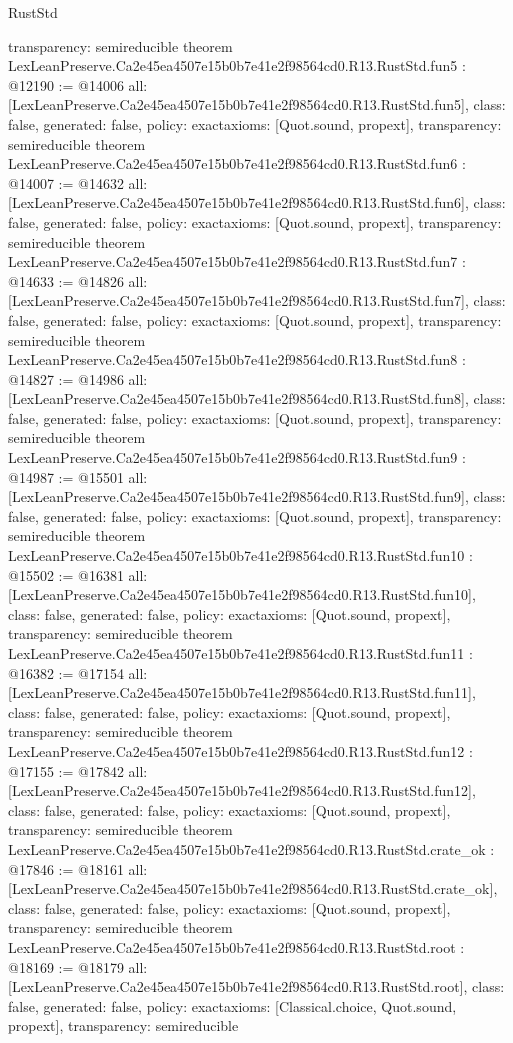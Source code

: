 \begin{lexlean}{RustStd}
\begin{coremodule}
{  transparency: semireducible
}
theorem LexLeanPreserve.Ca2e45ea4507e15b0b7e41e2f98564cd0.R13.RustStd.fun5 : @12190 := @14006 {
  all: [LexLeanPreserve.Ca2e45ea4507e15b0b7e41e2f98564cd0.R13.RustStd.fun5],
  class: false,
  generated: false,
  policy: exact{axioms: [Quot.sound, propext]},
  transparency: semireducible
}
theorem LexLeanPreserve.Ca2e45ea4507e15b0b7e41e2f98564cd0.R13.RustStd.fun6 : @14007 := @14632 {
  all: [LexLeanPreserve.Ca2e45ea4507e15b0b7e41e2f98564cd0.R13.RustStd.fun6],
  class: false,
  generated: false,
  policy: exact{axioms: [Quot.sound, propext]},
  transparency: semireducible
}
theorem LexLeanPreserve.Ca2e45ea4507e15b0b7e41e2f98564cd0.R13.RustStd.fun7 : @14633 := @14826 {
  all: [LexLeanPreserve.Ca2e45ea4507e15b0b7e41e2f98564cd0.R13.RustStd.fun7],
  class: false,
  generated: false,
  policy: exact{axioms: [Quot.sound, propext]},
  transparency: semireducible
}
theorem LexLeanPreserve.Ca2e45ea4507e15b0b7e41e2f98564cd0.R13.RustStd.fun8 : @14827 := @14986 {
  all: [LexLeanPreserve.Ca2e45ea4507e15b0b7e41e2f98564cd0.R13.RustStd.fun8],
  class: false,
  generated: false,
  policy: exact{axioms: [Quot.sound, propext]},
  transparency: semireducible
}
theorem LexLeanPreserve.Ca2e45ea4507e15b0b7e41e2f98564cd0.R13.RustStd.fun9 : @14987 := @15501 {
  all: [LexLeanPreserve.Ca2e45ea4507e15b0b7e41e2f98564cd0.R13.RustStd.fun9],
  class: false,
  generated: false,
  policy: exact{axioms: [Quot.sound, propext]},
  transparency: semireducible
}
theorem LexLeanPreserve.Ca2e45ea4507e15b0b7e41e2f98564cd0.R13.RustStd.fun10 : @15502 := @16381 {
  all: [LexLeanPreserve.Ca2e45ea4507e15b0b7e41e2f98564cd0.R13.RustStd.fun10],
  class: false,
  generated: false,
  policy: exact{axioms: [Quot.sound, propext]},
  transparency: semireducible
}
theorem LexLeanPreserve.Ca2e45ea4507e15b0b7e41e2f98564cd0.R13.RustStd.fun11 : @16382 := @17154 {
  all: [LexLeanPreserve.Ca2e45ea4507e15b0b7e41e2f98564cd0.R13.RustStd.fun11],
  class: false,
  generated: false,
  policy: exact{axioms: [Quot.sound, propext]},
  transparency: semireducible
}
theorem LexLeanPreserve.Ca2e45ea4507e15b0b7e41e2f98564cd0.R13.RustStd.fun12 : @17155 := @17842 {
  all: [LexLeanPreserve.Ca2e45ea4507e15b0b7e41e2f98564cd0.R13.RustStd.fun12],
  class: false,
  generated: false,
  policy: exact{axioms: [Quot.sound, propext]},
  transparency: semireducible
}
theorem LexLeanPreserve.Ca2e45ea4507e15b0b7e41e2f98564cd0.R13.RustStd.crate_ok : @17846 := @18161 {
  all: [LexLeanPreserve.Ca2e45ea4507e15b0b7e41e2f98564cd0.R13.RustStd.crate_ok],
  class: false,
  generated: false,
  policy: exact{axioms: [Quot.sound, propext]},
  transparency: semireducible
}
theorem LexLeanPreserve.Ca2e45ea4507e15b0b7e41e2f98564cd0.R13.RustStd.root : @18169 := @18179 {
  all: [LexLeanPreserve.Ca2e45ea4507e15b0b7e41e2f98564cd0.R13.RustStd.root],
  class: false,
  generated: false,
  policy: exact{axioms: [Classical.choice, Quot.sound, propext]},
  transparency: semireducible
}


\end{coremodule}
\end{lexlean}
